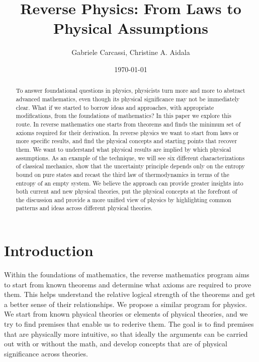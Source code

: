 \documentclass[10pt,twocolumn, nofootinbib]{revtex4-2}
\begin{document}
\title{Reverse Physics: From Laws to Physical Assumptions}
\author{Gabriele Carcassi, Christine A. Aidala}

\date{\today}


\begin{abstract}
To answer foundational questions in physics, physicists turn more and more to abstract advanced mathematics, even though its physical significance may not be immediately clear. What if we started to borrow ideas and approaches, with appropriate modifications, from the foundations of mathematics? In this paper we explore this route. In reverse mathematics\cite{friedman1976systems,simpson2017reverse,stillwellreverse} one starts from theorems and finds the minimum set of axioms required for their derivation. In reverse physics we want to start from laws or more specific results, and find the physical concepts and starting points that recover them. We want to understand what physical results are implied by which physical assumptions. As an example of the technique, we will see six different characterizations of classical mechanics, show that the uncertainty principle depends only on the entropy bound on pure states and recast the third law of thermodynamics in terms of the entropy of an empty system. We believe the approach can provide greater insights into both current and new physical theories, put the physical concepts at the forefront of the discussion and provide a more unified view of physics by highlighting common patterns and ideas across different physical theories.
\end{abstract}

\maketitle

\section{Introduction}

Within the foundations of mathematics, the reverse mathematics program\cite{friedman1976systems,simpson2017reverse,stillwellreverse} aims to start from known theorems and determine what axioms are required to prove them. This helps understand the relative logical strength of the theorems and get a better sense of their relationships. We propose a similar program for physics. We start from known physical theories or elements of physical theories, and we try to find premises that enable us to rederive them. The goal is to find premises that are physically more intuitive, so that ideally the arguments can be carried out with or without the math, and develop concepts that are of physical significance across theories.
\end{document}
